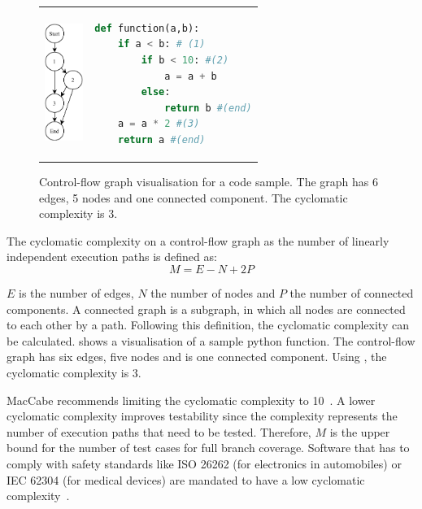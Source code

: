 \begin{figure}
\begin{tabular}{p{}p{}}
    \begin{minipage}{0.45\textwidth}
        \centering
    \includegraphics[height=1.5in]{img/Background/control-flow-graph.pdf}
    \label{fig:background_control_flow_graph_image}
    \end{minipage}
&
\begin{minipage}[c]{0.45\textwidth}
\centering
\begin{lstlisting}[language=Python, label=lst:background_control_flow_graph_listing]
def function(a,b):
    if a < b: # (1)
        if b < 10: #(2)
            a = a + b
        else:
            return b #(end)
    a = a * 2 #(3)
    return a #(end)
\end{lstlisting}
\end{minipage}
\end{tabular}
\caption[Control-flow graph visualisation for a code sample]{Control-flow graph visualisation for a code sample. The graph has 6 edges, 5 nodes and one connected component. The cyclomatic complexity is 3. }
\label{fig:background_control_flow_graph}
\end{figure}

The cyclomatic complexity on a control-flow graph as the number of linearly independent execution paths is defined as:
\begin{equation}\label{eq:cyclomatic_complexity}
M = E - N + 2P
\end{equation}

$E$ is the number of edges, $N$ the number of nodes and $P$ the number of connected components.  A connected graph is a subgraph, in which all nodes are connected to each other by a path. Following this definition, the cyclomatic complexity can be calculated.  shows a visualisation of a sample python function. The control-flow graph has six edges, five nodes and is one connected component. Using , the cyclomatic complexity is 3.

MacCabe recommends limiting the cyclomatic complexity to 10~\cite{mccabe_complexity_1976}. A lower cyclomatic complexity improves testability since the complexity represents the number of execution paths that need to be tested. Therefore, $M$ is the upper bound for the number of test cases for full branch coverage. 
Software that has to comply with safety standards like ISO 26262 (for electronics in automobiles) or IEC 62304 (for medical devices) are mandated to have a low cyclomatic complexity~\cite{isotc_22sc_32_iso_2018, isotc_210_iec_2006}.

